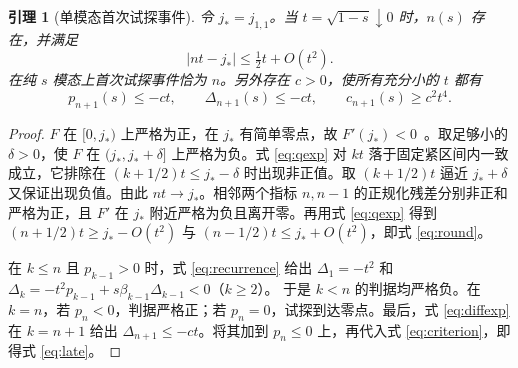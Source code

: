 \documentclass[11pt,a4paper,UTF8,fontset=fandol]{ctexart}
\newtheorem{lemma}[theorem]{引理}
\begin{document}
\begin{lemma}[单模态首次试探事件]\label{lem:cross}
令 \(j_*=j_{1,1}\)。当 \(t=\sqrt{1-s}\downarrow0\) 时，\(n(s)\) 存在，并满足
\begin{equation}
 |nt-j_*|\le \tfrac12t+O(t^2).
 \label{eq:round}
\end{equation}
在纯 \(s\) 模态上首次试探事件恰为 \(n\)。另外存在 \(c>0\)，使所有充分小的 \(t\) 都有
\begin{equation}
 p_{n+1}(s)\le-ct,\qquad
 \Delta_{n+1}(s)\le-ct,\qquad
 c_{n+1}(s)\ge c^2t^4 .
 \label{eq:late}
\end{equation}
\end{lemma}
\begin{proof}
\(F\) 在 \([0,j_*)\) 上严格为正，在 \(j_*\) 有简单零点，故 \(F'(j_*)<0\)~\cite[第 10.21 节]{dlmf}。取足够小的 \(\delta>0\)，使 \(F\) 在 \((j_*,j_*+\delta]\) 上严格为负。式 \eqref{eq:qexp} 对 \(k t\) 落于固定紧区间内一致成立，它排除在 \((k+1/2)t\le j_*-\delta\) 时出现非正值。取 \((k+1/2)t\) 逼近 \(j_*+\delta\) 又保证出现负值。由此 \(nt\to j_*\)。相邻两个指标 \(n,n-1\) 的正规化残差分别非正和严格为正，且 \(F'\) 在 \(j_*\) 附近严格为负且离开零。再用式 \eqref{eq:qexp} 得到
\((n+1/2)t\ge j_*-O(t^2)\) 与 \((n-1/2)t\le j_*+O(t^2)\)，即式 \eqref{eq:round}。

在 \(k\le n\) 且 \(p_{k-1}>0\) 时，式 \eqref{eq:recurrence} 给出
\(\Delta_1=-t^2\) 和
\(\Delta_k=-t^2p_{k-1}+s\beta_{k-1}\Delta_{k-1}<0\)（\(k\ge2\)）。
于是 \(k<n\) 的判据均严格负。在 \(k=n\)，若 \(p_n<0\)，判据严格正；若 \(p_n=0\)，试探到达零点。最后，式 \eqref{eq:diffexp} 在 \(k=n+1\) 给出 \(\Delta_{n+1}\le-ct\)。将其加到 \(p_n\le0\) 上，再代入式 \eqref{eq:criterion}，即得式 \eqref{eq:late}。
\end{proof}
\end{document}
